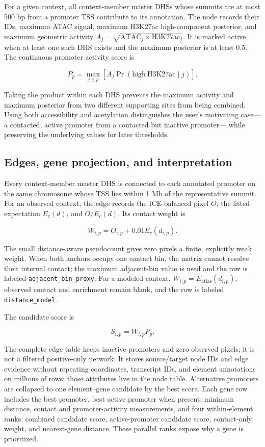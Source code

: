 \documentclass[11pt]{article}
\begin{document}
For a given context, all context-member master DHSs whose summits are at most
500 bp from a promoter TSS contribute to its annotation.  The node records
their IDs, maximum ATAC signal, maximum H3K27ac high-component posterior, and
maximum geometric activity
$A_j=\sqrt{\mathrm{ATAC}_j\times\mathrm{H3K27ac}_j}$.  It is marked active
when at least one such DHS exists and the maximum posterior is at least 0.5.
The continuous promoter activity score is

\[
  P_p = \max_{j\in p}\left[A_j\Pr(\mathrm{high\ H3K27ac}\mid j)\right].
\]

Taking the product within each DHS prevents the maximum activity and maximum
posterior from two different supporting sites from being combined.  Using
both accessibility and acetylation distinguishes the user's motivating
case---a contacted, active promoter from a contacted but inactive promoter---
while preserving the underlying values for later thresholds.

\subsection{Edges, gene projection, and interpretation}

Every context-member master DHS is connected to each annotated promoter on the
same chromosome whose TSS lies within 1 Mb of the representative summit.  For
an observed context, the edge records the ICE-balanced pixel $O$, the fitted
expectation $E_c(d)$, and $O/E_c(d)$.  Its contact weight is

\[
  W_{i,p}=O_{i,p}+0.01E_c(d_{i,p}).
\]

The small distance-aware pseudocount gives zero pixels a finite, explicitly
weak weight.  When both anchors occupy one contact bin, the matrix cannot
resolve their internal contact; the maximum adjacent-bin value is used and the
row is labeled \texttt{adjacent\_bin\_proxy}.  For a modeled context,
$W_{i,p}=E_{\mathrm{atlas}}(d_{i,p})$, observed contact and enrichment remain
blank, and the row is labeled \texttt{distance\_model}.

The candidate score is

\[
  S_{i,p}=W_{i,p}P_p.
\]

The complete edge table keeps inactive promoters and zero observed pixels; it
is not a filtered positive-only network.  It stores source/target node IDs and
edge evidence without repeating coordinates, transcript IDs, and element
annotations on millions of rows; those attributes live in the node table.
Alternative promoters are collapsed
to one element--gene candidate by the best score.  Each gene row includes the
best promoter, best active promoter when present, minimum distance, contact
and promoter-activity measurements, and four within-element ranks: combined
candidate score, active-promoter candidate score, contact-only weight, and
nearest-gene distance.  These parallel ranks expose why a gene is prioritized.
\end{document}
